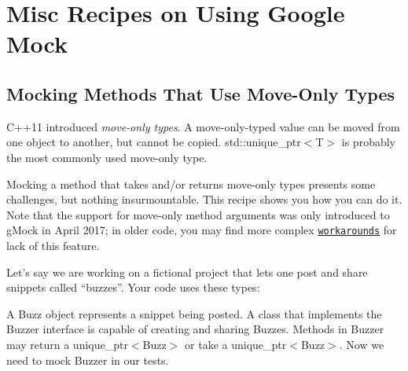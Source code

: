 \section*{Misc Recipes on Using Google Mock}

\subsection*{Mocking Methods That Use Move-\/Only Types}

C++11 introduced {\itshape move-\/only types}. A move-\/only-\/typed value can be moved from one object to another, but cannot be copied. {\ttfamily std\+::unique\+\_\+ptr$<$T$>$} is probably the most commonly used move-\/only type.

Mocking a method that takes and/or returns move-\/only types presents some challenges, but nothing insurmountable. This recipe shows you how you can do it. Note that the support for move-\/only method arguments was only introduced to g\+Mock in April 2017; in older code, you may find more complex \href{#LegacyMoveOnly}{\tt workarounds} for lack of this feature.

Let’s say we are working on a fictional project that lets one post and share snippets called “buzzes”. Your code uses these types\+:


\begin{DoxyCode}{0}
\DoxyCodeLine{}
\DoxyCodeLine{ \textcolor{keyword}{public}:}
\DoxyCodeLine{\};}
\DoxyCodeLine{}
\DoxyCodeLine{ \textcolor{keyword}{public}:}
\DoxyCodeLine{\};}
\end{DoxyCode}


A {\ttfamily Buzz} object represents a snippet being posted. A class that implements the {\ttfamily Buzzer} interface is capable of creating and sharing {\ttfamily Buzz}es. Methods in {\ttfamily Buzzer} may return a {\ttfamily unique\+\_\+ptr$<$Buzz$>$} or take a {\ttfamily unique\+\_\+ptr$<$Buzz$>$}. Now we need to mock {\ttfamily Buzzer} in our tests.

